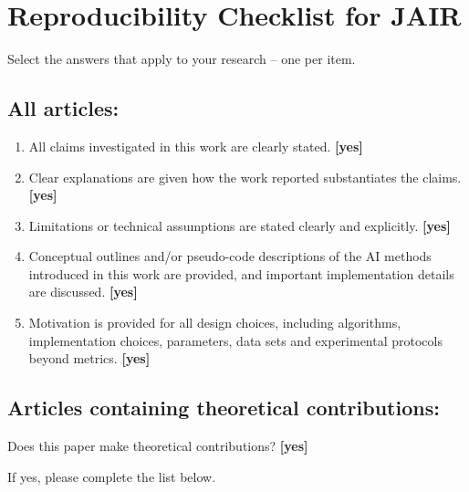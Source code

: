 %

\section{Reproducibility Checklist for JAIR}

Select the answers that apply to your research -- one per item.

\subsection*{All articles:}

\begin{enumerate}
    \item All claims investigated in this work are clearly stated.
    \textbf{[yes]}
    \item Clear explanations are given how the work reported substantiates the
    claims. \textbf{[yes]}
    \item Limitations or technical assumptions are stated clearly and
    explicitly. \textbf{[yes]}
    \item Conceptual outlines and/or pseudo-code descriptions of the AI methods
    introduced in this work are provided, and important implementation details
    are discussed. \textbf{[yes]}
    \item
    Motivation is provided for all design choices, including algorithms,
    implementation choices, parameters, data sets and experimental protocols
    beyond metrics. \textbf{[yes]}
\end{enumerate}

\subsection*{Articles containing theoretical contributions:}
Does this paper make theoretical contributions? \textbf{[yes]}

If yes, please complete the list below.

